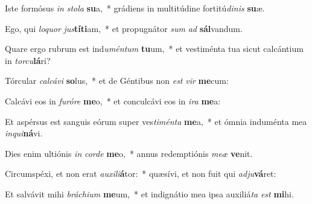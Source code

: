 \item Iste formósus \textit{in} \textit{sto}\textit{la} \textbf{su}a,~* grádiens in multitúdine fortitú\textit{di}\textit{nis} \textbf{su}æ.
\item Ego, qui \textit{lo}\textit{quor} \textit{jus}\textbf{tí}\textbf{ti}am,~* et propugnátor \textit{sum} \textit{ad} \textbf{sál}vandum.
\item Quare ergo rubrum est ind\textit{u}\textit{mén}\textit{tum} \textbf{tu}um,~* et vestiménta tua sicut calcántium in \textit{tor}\textit{cu}\textbf{lá}ri?
\item Tórcular \textit{cal}\textit{cá}\textit{vi} \textbf{so}lus,~* et de Géntibus non \textit{est} \textit{vir} \textbf{me}cum:
\item Calcávi eos in \textit{fu}\textit{ró}\textit{re} \textbf{me}o,~* et conculcávi eos in \textit{i}\textit{ra} \textbf{me}a:
\item Et aspérsus est sanguis eórum super ves\textit{ti}\textit{mén}\textit{ta} \textbf{me}a,~* et ómnia induménta mea \textit{in}\textit{qui}\textbf{ná}vi.
\item Dies enim ultiónis \textit{in} \textit{cor}\textit{de} \textbf{me}o,~* annus redemptiónis \textit{me}\textit{æ} \textbf{ve}nit.
\item Circumspéxi, et non erat \textit{au}\textit{xi}\textit{li}\textbf{á}tor:~* quæsívi, et non fuit qui \textit{ad}\textit{ju}\textbf{vá}ret:
\item Et salvávit mihi \textit{brá}\textit{chi}\textit{um} \textbf{me}um,~* et indignátio mea ipsa auxiliá\textit{ta} \textit{est} \textbf{mi}hi.
